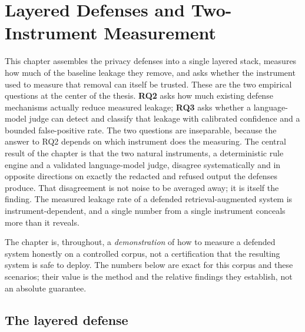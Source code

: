 \chapter{Layered Defenses and Two-Instrument Measurement}
\label{ch:defenses}

This chapter assembles the privacy defenses into a single layered stack, measures how
much of the baseline leakage they remove, and asks whether the instrument used to measure
that removal can itself be trusted. These are the two empirical questions at the center of
the thesis. \textbf{RQ2} asks how much existing defense mechanisms actually reduce measured
leakage; \textbf{RQ3} asks whether a language-model judge can detect and classify that
leakage with calibrated confidence and a bounded false-positive rate. The two questions are
inseparable, because the answer to RQ2 depends on which instrument does the measuring. The
central result of the chapter is that the two natural instruments, a deterministic rule engine and
a validated language-model judge, disagree systematically and in opposite directions on exactly
the redacted and refused output the defenses produce. That disagreement is not noise to be
averaged away; it is itself the finding. The measured leakage rate of a defended
retrieval-augmented system is instrument-dependent, and a single number from a single instrument
conceals more than it reveals.

The chapter is, throughout, a \emph{demonstration} of how to measure a defended system honestly on
a controlled corpus, not a certification that the resulting system is safe to deploy. The numbers
below are exact for this corpus and these scenarios; their value is the method and the relative
findings they establish, not an absolute guarantee.

\section{The layered defense}
\label{sec:ch5-defense}

